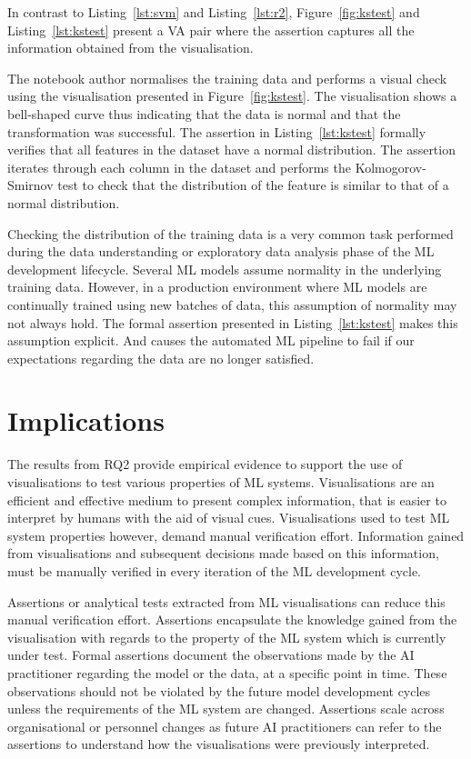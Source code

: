 \documentclass[conference]{IEEEtran}
\begin{document}
In contrast to Listing~\ref{lst:svm} and Listing~\ref{lst:r2}, Figure~\ref{fig:kstest} and Listing~\ref{lst:kstest} present a VA pair where the assertion captures all the information obtained from the visualisation.

The notebook author normalises the training data and performs a visual check using the visualisation presented in Figure~\ref{fig:kstest}. The visualisation shows a bell-shaped curve thus indicating that the data is normal and that the transformation was successful. The assertion in Listing~\ref{lst:kstest} formally verifies that all features in the dataset have a normal distribution. The assertion iterates through each column in the dataset and performs the Kolmogorov-Smirnov test to check that the distribution of the feature is similar to that of a normal distribution.

Checking the distribution of the training data is a very common task performed during the data understanding or exploratory data analysis phase of the ML development lifecycle. Several ML models assume normality in the underlying training data. However, in a production environment where ML models are continually trained using new batches of data, this assumption of normality may not always hold. The formal assertion presented in Listing~\ref{lst:kstest} makes this assumption explicit. And causes the automated ML pipeline to fail if our expectations regarding the data are no longer satisfied.

\section{Implications}\label{sec:discuss}

The results from RQ2 provide empirical evidence to support the use of visualisations to test various properties of ML systems.  Visualisations are an efficient and effective medium to present complex information, that is easier to interpret by humans with the aid of visual cues. Visualisations used to test ML system properties however, demand manual verification effort. Information gained from visualisations and subsequent decisions made based on this information, must be manually verified in every iteration of the ML development cycle.


Assertions or analytical tests extracted from ML visualisations can reduce this manual verification effort. Assertions encapsulate the knowledge gained from the visualisation with regards to the property of the ML system which is currently under test. Formal assertions document the observations made by the AI practitioner regarding the model or the data, at a specific point in time. These observations should not be violated by the future model development cycles unless the requirements of the ML system are changed. Assertions scale across organisational or personnel changes as future AI practitioners can refer to the assertions to understand how the visualisations were previously interpreted.
\end{document}
